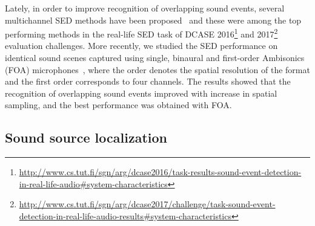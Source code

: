 \documentclass[journal]{IEEEtran}
\begin{document}
Lately, in order to improve recognition of overlapping sound events, several multichannel SED methods have been proposed~\cite{Adavanne2017,Jeong2017,Zhou2017,Lu2017,temko2007} and these were among the top performing methods in the real-life SED task of DCASE 2016\footnote{\url{http://www.cs.tut.fi/sgn/arg/dcase2016/task-results-sound-event-detection-in-real-life-audio#system-characteristics}} and 2017\footnote{\url{http://www.cs.tut.fi/sgn/arg/dcase2017/challenge/task-sound-event-detection-in-real-life-audio-results#system-characteristics}} evaluation challenges. More recently, we studied the SED performance on identical sound scenes captured using single, binaural and first-order Ambisonics (FOA) microphones~\cite{Adavanne2018_IJCNN}, where the order denotes the spatial resolution of the format and the first order corresponds to four channels. The results showed that the recognition of overlapping sound events improved with increase in spatial sampling, and the best performance was obtained with FOA. 



\subsection{Sound source localization}
\end{document}
